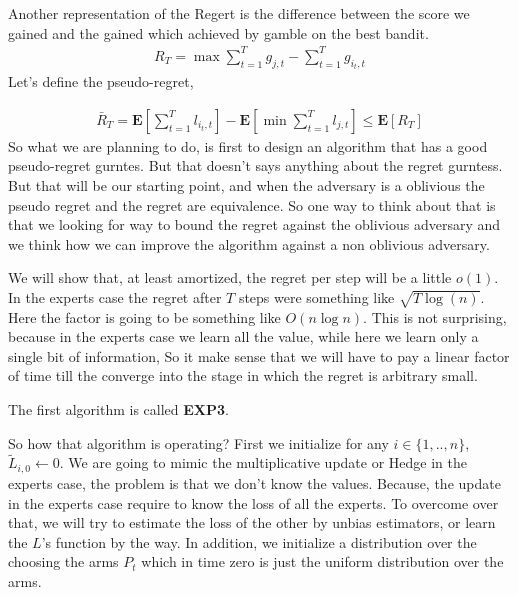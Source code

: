 \documentclass{article}
\newcommand{\expp}[1]{ \mathbf{E} \left[ {#1} \right]}
\begin{document}
\begin{multicols*}{2}
  Another representation of the Regert is the difference between the score we gained and the gained which achieved by gamble on the best bandit.  
\begin{equation*}
    \begin{split}
      R_{T} = \max \sum_{t=1}^{T}{g_{j,t}}-\sum_{t=1}^{T}{g_{i_{t},t}} 
    \end{split}
  \end{equation*}
 Let's define the pseudo-regret, 

 \begin{equation*}
   \begin{split}
     \bar{R}_{T} = \expp{ \sum_{t=1}^{T}{l_{i_{t},t}}} - \expp{ \min \sum_{t=1}^{T}{l_{j,t}}} \le \expp{R_{T}}  
   \end{split}
 \end{equation*}
 So what we are planning to do, is first to design an algorithm that has a good pseudo-regret gurntes. But that doesn't says anything about the regret gurntess. But that will be our starting point, and when the adversary is a oblivious the pseudo regret and the regret are equivalence. So one way to think about that is that we looking for way to bound the regret against the oblivious adversary and we think how we can improve the algorithm against a non oblivious adversary. 

 We will show that, at least amortized, the regret per step will be a little $o\left( 1 \right)$.  In the experts case the regret after $T$ steps were something like $\sqrt{T\log\left( n \right)}$. Here the factor is going to be something like $O\left( n\log n \right)$. This is not surprising, because in the experts case we learn all the value, while here we learn only a single bit of information, So it make sense that we will have to pay a linear factor of time till the converge into the stage in which the regret is arbitrary small. 

 The first algorithm is called \textbf{EXP3}.

 So how that algorithm is operating? First we initialize for any $i \in \{ 1 , .. , n\}$, $\tilde{L}_{i,0} \leftarrow 0 $. We are going to mimic the multiplicative update or Hedge in the experts case, the problem is that we don't know the values. Because, the update in the experts case require to know the loss of all the experts. To overcome over that, we will try to estimate the loss of the other by unbias estimators, or learn the $L$'s function by the way.   
 In addition, we initialize a distribution over the choosing the arms $P_{t}$ which in time zero is just the uniform distribution over the arms. 


\end{multicols*}
\end{document}
